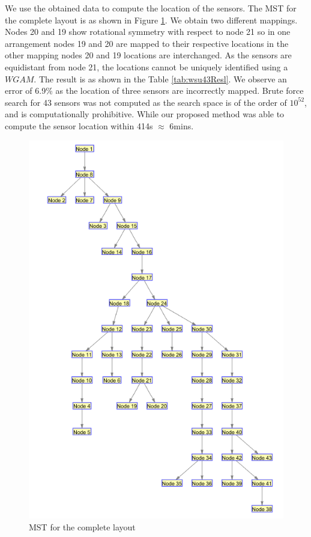 We use the obtained data to compute the location of the sensors. The MST for the complete layout is as shown in Figure \ref{fig:MST43}. We obtain two different mappings. 
Nodes 20 and 19 show rotational symmetry with respect to node 21 so in one arrangement nodes 19 and 20 are mapped to their respective locations in the other mapping nodes 20 and 19 locations are interchanged. As the sensors are equidistant from node 21, the locations cannot be uniquely identified using a $WGAM$. 
The result is as shown in the Table \ref{tab:wsu43Resl}. We observe an error of 6.9\% as the location of three sensors are incorrectly mapped.
Brute force search for 43 sensors was not computed as the search space is of the order of $10^{52}$, and is computationally prohibitive.
While our proposed method was able to compute the sensor location within 414s $\approx$ 6mins. 
  
  

\begin{figure}
\centering
\includegraphics[width=\textwidth]{./pics/43_sensors.png}
\caption{MST for the complete layout}
\label{fig:MST43}
\end{figure}
 
